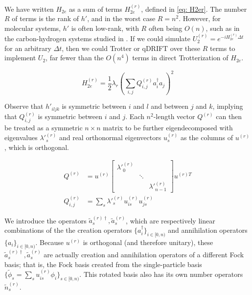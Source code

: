 We have written $H_{2e}$ as a sum of terms $H_{2e}^{(r)}$, defined in \eqref{eq: H2er}. The number $R$ of terms is the rank of $h'$, and in the worst case $R = n^2$. However, for molecular systems, $h'$ is often low-rank, with $R$ often being $O(n)$, such as in the carbon-hydrogen systems studied in \cite{CH}. If we could simulate $U_2^{(r)} = e^{-iH_{2e}^{(r)}\Delta t}$ for an arbitrary $\Delta t$, then we could Trotter or qDRIFT over these $R$ terms to implement $U_2$, far fewer than the $O(n^4)$ terms in direct Trotterization of $H_{2e}$.

\begin{equation}
    H_{2e}^{(r)} = \frac{1}{2}\lambda_r\left(\sum_{i,j} Q^{(r)}_{i, j}a^\dag_ia_j\right)^2 \label{eq: H2er}
\end{equation}

Observe that $h'_{iljk}$ is symmetric between $i$ and $l$ and between $j$ and $k$, implying that $Q^{(r)}_{i, j}$ is symmetric between $i$ and $j$. Each $n^2$-length vector $Q^{(r)}$ can then be treated as a symmetric $n \times n$ matrix to be further eigendecomposed with eigenvalues $\lambda'^{(r)}_s$ and real orthonormal eigenvectors $u^{(r)}_s$ as the columns of $u^{(r)}$, which is orthogonal.

\begin{equation}
    \begin{split}
        Q^{(r)} &= u^{(r)}\begin{bmatrix}
            \lambda'^{(r)}_0 & & \\ & \ddots & \\ & & \lambda'^{(r)}_{n - 1}
          \end{bmatrix}u^{(r)T} \\
        Q^{(r)}_{i, j} &= \sum_s \lambda'^{(r)}_s u^{(r)}_{is}u^{(r)}_{js}
    \end{split}
\end{equation}

We introduce the operators $\tilde{a}^{(r)\dag}_s, \tilde{a}^{(r)}_s$, which are respectively linear combinations of the the creation operators $\{a^\dag_i\}_{i \in [0, n)}$ and annihilation operators $\{a_i\}_{i \in [0, n)}$. Because $u^{(r)}$ is orthogonal (and therefore unitary), these $\tilde{a}^{(r)\dag}_s, \tilde{a}^{(r)}_s$ are actually creation and annihilation operators of a different Fock basis; that is, the Fock basis created from the single-particle basis $\{\tilde{\phi}_s = \sum_s u^{(r)}_{is} \phi_i\}_{s \in [0, n)}$. This rotated basis also has its own number operators $\tilde{n}^{(r)}_s$.

